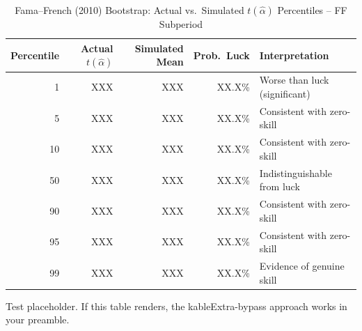 \documentclass[12pt]{article}
\begin{document}
\begin{table}[H]
\small
\centering
\caption{Fama--French (2010) Bootstrap: Actual vs.\ Simulated $t(\hat{\alpha})$ Percentiles -- FF Subperiod}
\label{tab:bootstrap_tails_FF}
\begin{threeparttable}
\begin{tabular}{rrrrl}
\toprule
Percentile & Actual $t(\hat{\alpha})$ & Simulated Mean & Prob.\ Luck & Interpretation \\
\midrule
 1 & XXX & XXX & XX.X\% & Worse than luck (significant) \\
 5 & XXX & XXX & XX.X\% & Consistent with zero-skill \\
10 & XXX & XXX & XX.X\% & Consistent with zero-skill \\
50 & XXX & XXX & XX.X\% & Indistinguishable from luck \\
90 & XXX & XXX & XX.X\% & Consistent with zero-skill \\
95 & XXX & XXX & XX.X\% & Consistent with zero-skill \\
99 & XXX & XXX & XX.X\% & Evidence of genuine skill \\
\bottomrule
\end{tabular}
\begin{tablenotes}
\footnotesize
\item Test placeholder. If this table renders, the kableExtra-bypass approach works in your preamble.
\end{tablenotes}
\end{threeparttable}
\end{table}
\end{document}
